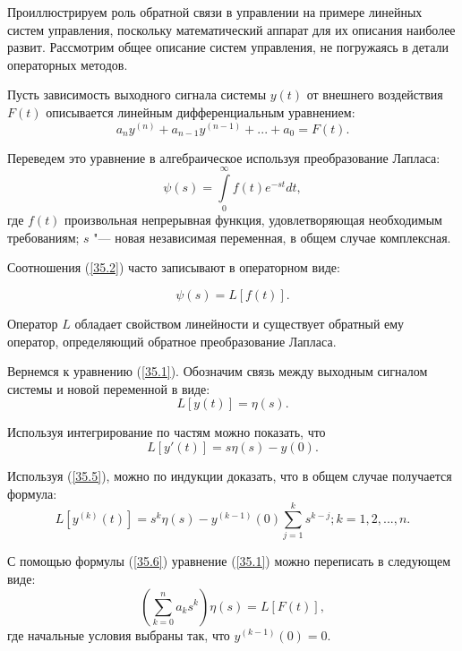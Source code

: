 \documentclass[12pt,a4paper,oneside]{book}
\begin{document}
Проиллюстрируем роль обратной связи в управлении на примере линейных систем управления, поскольку математический аппарат для их описания наиболее развит. Рассмотрим общее описание систем управления, не погружаясь в детали операторных методов.

Пусть зависимость выходного сигнала системы $y(t)$ от внешнего воздействия $F(t)$ описывается линейным дифференциальным уравнением: 
\begin{equation}
\label{35.1}
	a_n y^{(n)}+a_{n-1}y^{(n-1)}+...+a_0=F(t).
\end{equation}

Переведем это уравнение в алгебраическое используя преобразование Лапласа: 
\begin{equation}
\label{35.2}
	\psi(s)=\int \limits_0^\infty f(t) e^{-st} dt,
\end{equation}
где $f(t)$ произвольная непрерывная функция, удовлетворяющая необходимым требованиям; $s$ "--- новая независимая переменная, в общем случае комплексная. 

Соотношения (\ref{35.2}) часто записывают в операторном виде: 

\begin{equation}
\label{35.3}
	\psi(s)=L[f(t)].
\end{equation}

Оператор $L$ обладает свойством линейности и существует обратный ему оператор, определяющий обратное преобразование Лапласа.

Вернемся к уравнению (\ref{35.1}). Обозначим связь между выходным сигналом системы и новой переменной в виде:
\begin{equation}
\label{35.4}
	L[y(t)]=\eta(s).
\end{equation}

Используя интегрирование по частям можно показать, что 
\begin{equation}
\label{35.5}
	L[y'(t)]=s\eta(s)-y(0).
\end{equation}

Используя (\ref{35.5}), можно по индукции доказать, что в общем случае получается формула:
\begin{equation}
\label{35.6}
	L[y^{(k)}(t)]=s^k \eta(s)-y^{(k-1)}(0)\sum\limits_{j=1}^k s^{k-j}; k=1,2,...,n.
\end{equation}

С помощью формулы (\ref{35.6}) уравнение (\ref{35.1}) можно переписать в следующем виде:
\begin{equation}
\label{35.7}
	\left( \sum\limits_{k=0}^n a_k s^k\right)\eta(s)=L[F(t)],
\end{equation}
где начальные условия выбраны так, что $y^{(k-1)}(0) = 0$.
\end{document}
